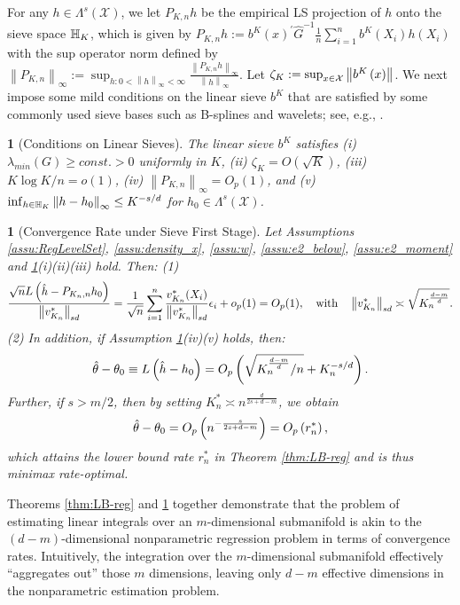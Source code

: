 \documentclass[12pt,american]{article}
\theoremstyle{definition}
\theoremstyle{plain}
\newtheorem{assumption}{\protect\assumptionname}
\theoremstyle{definition}
\theoremstyle{plain}
\theoremstyle{plain}
\newtheorem{thm}{\protect\theoremname}
\theoremstyle{plain}
\theoremstyle{plain}
\theoremstyle{plain}
\newcommand{\norm}[1]{\left\| #1 \right\|}
\providecommand{\assumptionname}{Assumption}
\providecommand{\theoremname}{Theorem}
\providecommand{\assumptionname}{Assumption}
\providecommand{\theoremname}{Theorem}
\begin{document}
For any $h\in \Lambda^s(\mathcal{X})$, we let $P_{K,n}h$ be the empirical LS projection of $h$ onto the sieve space ${\mathbb{H}}_{K}$, which is given by
$P_{K,n}h:= b^{K}\left(x\right)^{\prime}\hat{G}^{-1}\frac{1}{n}\sum_{i=1}^{n} b^{K}\left(X_{i}\right)h\left(X_{i}\right)$
with the sup operator norm defined by
$\norm{P_{K,n}}_{\infty}:=\sup_{h:0<\norm h_{\infty}<\infty}\frac{\norm{P_{K,n}h}_{\infty}}{\norm h_{\infty}}$.
Let $\zeta_{K}:=\sup_{x\in{\cal X}}\norm{ b^{K}\left(x\right)}$. We next impose some mild conditions on the linear sieve $b^{K}$ that are satisfied by some commonly used sieve bases such as B-splines and wavelets; see, e.g., \cite{chen2015optimal}.

\begin{assumption}[Conditions on Linear Sieves]
  \label{assu:Cond_Sieve} The linear sieve $b^{K}$ satisfies
  (i) $\lambda_{min} (G)\geq const. >0$ uniformly in $K$, (ii) $\zeta_{K}=O\left(\sqrt{K}\right)$, (iii) $K\log K/n=o(1)$,
  (iv) $\norm{P_{K,n}}_{\infty}=O_{p}\left(1\right)$,
  and (v) $\inf_{h\in {\H}_{K}}\norm{h-h_{0}}_{\infty}\leq K^{-s/d}$
  for $h_{0}\in\Lambda^{s}\left(\mathcal{X}\right)$.
\end{assumption}

\begin{thm}[Convergence Rate under Sieve First Stage]
  \label{thm:Rate_Sieve} Let Assumptions \ref{assu:RegLevelSet}, \ref{assu:density_x}, \ref{assu:w}, \ref{assu:e2_below}, \ref{assu:e2_moment} and \ref{assu:Cond_Sieve}(i)(ii)(iii) hold. Then: (1)
  \[
    \frac{\sqrt{n}L\left(\hat{h}-P_{K_n,n}h_0\right)}{\norm{v_{K_{n}}^{*}}_{sd}} = \frac{1}{\sqrt{n}}\sum_{i=1}^n \frac{v_{K_n}^*(X_i)}{\norm{v_{K_{n}}^{*}}_{sd}}\e_i +o_p(1)=O_p (1),~~~\text{with}~~~\norm{v^*_{K_n}}_{sd}\asymp \sqrt{K_{n}^{\frac{d-m}{d}}}.
  \]
  (2) In addition, if Assumption \ref{assu:Cond_Sieve}(iv)(v) holds, then:
  \[
    \hat{\theta}-\theta_{0}\equiv L\left(\hat{h}-h_{0}\right)=O_{p}\left(\sqrt{K_{n}^{\frac{d-m}{d}}/n}+K_{n}^{-s/d}\right).
  \]
  Further, if $s>m/2$, then by setting $K_{n}^{*}\asymp n^{\frac{d}{2s+d-m}}$, we obtain
  \[
    \hat{\theta}-\theta_{0}=O_{p}\left(n^{-\frac{s}{2s+d-m}}\right)=O_{p}\left(r^*_{n}\right),
  \]
  which attains the lower bound rate $r^*_{n}$ in Theorem \ref{thm:LB-reg}
  and is thus minimax rate-optimal.
\end{thm}

Theorems \ref{thm:LB-reg} and \ref{thm:Rate_Sieve} together demonstrate that the problem of estimating linear integrals over an $m$-dimensional submanifold is akin to the $(d-m)$-dimensional nonparametric regression problem in terms of convergence rates. Intuitively, the integration over the $m$-dimensional submanifold effectively ``aggregates out'' those $m$ dimensions, leaving only $d-m$ effective dimensions in the nonparametric estimation problem.
\end{document}
